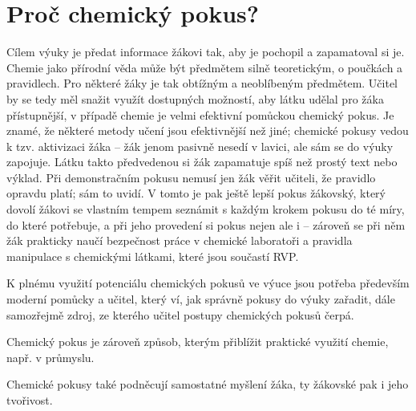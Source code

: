 \section{Proč chemický pokus?}
Cílem výuky je předat informace žákovi tak, aby je pochopil a zapamatoval si je. Chemie jako přírodní věda může být předmětem silně teoretickým, o poučkách a pravidlech. Pro některé žáky je tak obtížným a neoblíbeným předmětem.\cite{oblibenost} Učitel by se tedy měl snažit využít dostupných možností, aby látku udělal pro žáka přístupnější, v případě chemie je velmi efektivní pomůckou chemický pokus. Je znamé, že některé metody učení jsou efektivnější než jiné; chemické pokusy vedou k tzv. aktivizaci žáka -- žák jenom pasivně nesedí v lavici, ale sám se do výuky zapojuje. \cite{ostrava} Látku takto předvedenou si žák zapamatuje spíš než prostý text nebo výklad.\cite{badani} Při demonstračním pokusu nemusí jen žák věřit učiteli, že pravidlo opravdu platí; sám to uvidí. V tomto je pak ještě lepší pokus žákovský, který dovolí žákovi se vlastním tempem seznámit s každým krokem pokusu do té míry, do které potřebuje, a při jeho provedení si pokus nejen  ale i  -- zároveň se při něm žák prakticky naučí bezpečnost práce v chemické laboratoři a pravidla manipulace s chemickými látkami, které jsou součastí RVP.

K plnému využití potenciálu chemických pokusů ve výuce jsou potřeba především moderní pomůcky a učitel, který ví, jak správně pokusy do výuky zařadit, dále samozřejmě zdroj, ze kterého učitel postupy chemických pokusů čerpá.

Chemický pokus je zároveň způsob, kterým přiblížit praktické využití chemie, např. v průmyslu.

Chemické pokusy také podněcují samostatné myšlení žáka, ty žákovské pak i jeho tvořivost.
